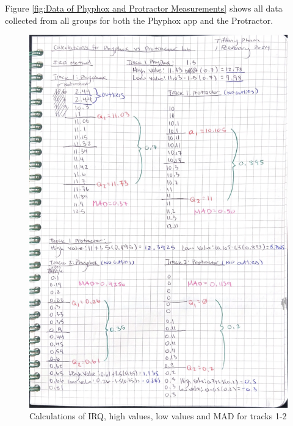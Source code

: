 \documentclass[idxtotoc,hyperref,openany]{labbook} %
\begin{document}
Figure \ref{fig:Data of Phyphox and Protractor Measurements} shows all data collected from all groups for both the Phyphox app and the Protractor.

\hfill \break
\vspace{3in}
\hfill \break
{}
\hfill \break
\begin{figure}[H] %
\begin{center}
\includegraphics[width=0.8\linewidth]{images/Lab.01/PhyProTrack1-2.png}
\end{center}
\caption{Calculations of IRQ, high values, low values and MAD for tracks 1-2}
\label{fig:Track1-2PhyphoxProtractor}
\end{figure}
\end{document}

